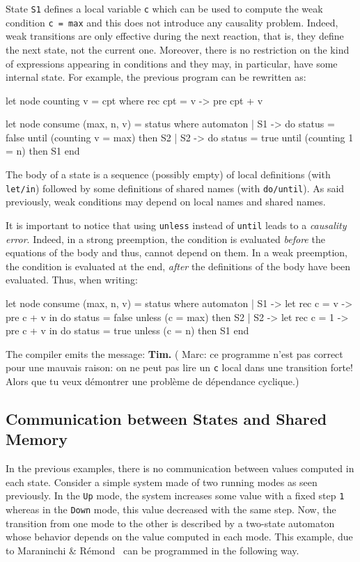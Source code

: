 \documentclass[11pt,titlepage,twoside]{report}
\newcommand{\Tim}[1]{{\bf Tim.} ({#1})}
\newenvironment{sample}
  {\begin{flushright}\begin{minipage}[t]{15cm}\begin{alltt}}
  {\end{alltt}\end{minipage}\end{flushright}}
\begin{document}
State \verb-S1- defines a local variable \verb-c- which can be used to
compute the weak condition \verb-c = max- and this does not introduce
any causality problem. Indeed, weak transitions are only effective
during the next reaction, that is, they define the next state, not the
current one. Moreover, there is no restriction on the kind of
expressions appearing in conditions and they may, in particular, have
some internal state. For example, the previous program can be
rewritten as:

\begin{runverbatim}
let node counting v = cpt where
  rec cpt = v -> pre cpt + v

let node consume (max, n, v) = status where
  automaton
  | S1 ->
       do status = false
       until (counting v = max) then S2
  | S2 ->
       do status = true
       until (counting 1 = n) then S1
  end
\end{runverbatim}
The body of a state is a sequence (possibly empty) of local
definitions (with \verb-let/in-) followed by some definitions of
shared names (with \verb-do/until-). As said previously, weak
conditions may depend on local names and shared names.

It is important to notice that using \verb-unless- instead of
\verb-until- leads to a {\em causality error}. Indeed, in a strong
preemption, the condition is evaluated {\em before} the equations of
the body and thus, cannot depend on them. In a weak preemption, the
condition is evaluated at the end, {\em after} the definitions of the
body have been evaluated. Thus, when writing:

\begin{runverbatim}[fail]
let node consume (max, n, v) = status where
  automaton
  | S1 ->
      let rec c = v -> pre c + v in
      do status = false
      unless (c = max) then S2
  | S2 ->
      let rec c = 1 -> pre c + v in
      do status = true
      unless (c = n) then S1
  end
\end{runverbatim}
The compiler emits the message:
\runverbatimerr
\Tim{ Marc: ce programme n'est pas correct pour une mauvais raison: on ne 
peut pas lire un \texttt{c} local dans une transition forte! Alors que tu 
veux démontrer une problème de dépendance cyclique.}

\subsection{Communication between States and Shared Memory}
In the previous examples, there is no communication between values
computed in each state. Consider a simple system made of two running
modes as seen previously. In the \verb-Up- mode, the system increases
some value with a fixed step \verb-1- whereas in the \verb-Down- mode,
this value decreased with the same step. Now, the transition from one
mode to the other is described by a two-state automaton whose behavior
depends on the value computed in each mode. This example, due to
Maraninchi \& R\'emond~\cite{Modes-SCP03} can be programmed in the
following way.
\end{document}
